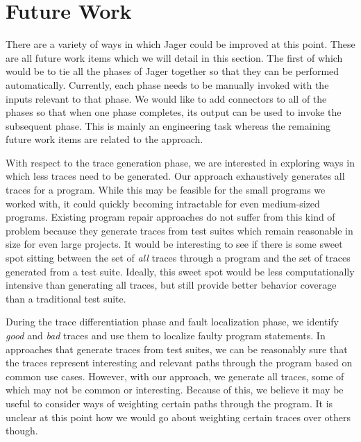 \documentclass[]{article}
\begin{document}


\section{Future Work}

There are a variety of ways in which Jager could be improved at this point.
These are all future work items which we will detail in this section. The
first of which would be to tie all the phases of Jager together so that they
can be performed automatically. Currently, each phase needs to be manually
invoked with the inputs relevant to that phase. We would like to add
connectors to all of the phases so that when one phase completes, its output
can be used to invoke the subsequent phase. This is mainly an engineering
task whereas the remaining future work items are related to the approach.

With respect to the trace generation phase, we are interested in exploring
ways in which less traces need to be generated. Our approach exhaustively
generates all traces for a program. While this may be feasible for the small
programs we worked with, it could quickly becoming intractable for even
medium-sized programs. Existing program repair approaches do not suffer from
this kind of problem because they generate traces from test suites which
remain reasonable in size for even large projects. It would be interesting to
see if there is some sweet spot sitting between the set of \emph{all} traces
through a program and the set of traces generated from a test suite.
Ideally, this sweet spot would be less computationally intensive than
generating all traces, but still provide better behavior coverage than a
traditional test suite.

During the trace differentiation phase and fault localization phase, we
identify \emph{good} and \emph{bad} traces and use them to localize faulty
program statements. In approaches that generate traces from test suites, we
can be reasonably sure that the traces represent interesting and relevant
paths through the program based on common use cases. However, with our
approach, we generate all traces, some of which may not be common or
interesting. Because of this, we believe it may be useful to consider ways
of weighting certain paths through the program. It is unclear at this point
how we would go about weighting certain traces over others though.
\end{document}
